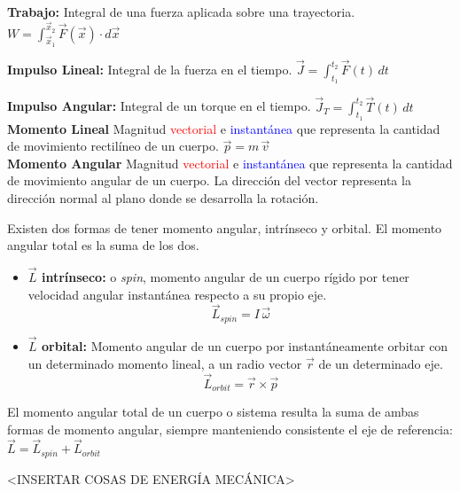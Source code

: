 \documentclass[12pt,a4paper]{article}
\begin{document}
\textbf{Trabajo:} Integral de una fuerza aplicada sobre una trayectoria. $\displaystyle W=\int_{\vec{x}_1}^{\vec{x}_2}\vec{F}(\vec{x})\cdot d\vec{x}$

\textbf{Impulso Lineal:} Integral de la fuerza en el tiempo. $\displaystyle \vec{J}=\int_{t_1}^{t_2}\vec{F}(t)\, dt$

\textbf{Impulso Angular:} Integral de un torque en el tiempo. $\displaystyle  \vec{J}_T=\int_{t_1}^{t_2}\vec{T}(t)\, dt$ \\

\textbf{Momento Lineal} Magnitud \textcolor{red}{vectorial} e \textcolor{blue}{instantánea} que representa la cantidad de movimiento rectilíneo de un cuerpo. $\displaystyle \vec{p}=m \, \vec{v}$ \\

\textbf{Momento Angular} Magnitud \textcolor{red}{vectorial} e \textcolor{blue}{instantánea} que representa la cantidad de movimiento angular de un cuerpo. La dirección del vector representa la dirección normal al plano donde se desarrolla la rotación.

Existen dos formas de tener momento angular, intrínseco y orbital. El momento angular total es la suma de los dos.

\begin{itemize}
	\item \textbf{$\vec{L}$ intrínseco:} o \textit{spin}, momento angular de un cuerpo rígido por tener velocidad angular instantánea respecto a su propio eje. $$\vec{L}_{spin} = I \, \vec{\omega}$$
	

	\item \textbf{$\vec{L}$ orbital:} Momento angular de un cuerpo por instantáneamente orbitar con un determinado momento lineal, a un radio vector $\vec{r}$ de un determinado eje. $$\vec{L}_{orbit} = \vec{r} \times \vec{p}$$
\end{itemize}

El momento angular total de un cuerpo o sistema resulta la suma de ambas formas de momento angular, siempre manteniendo consistente el eje de referencia: $\displaystyle \vec{L}=\vec{L}_{spin}+\vec{L}_{orbit}$


<INSERTAR COSAS DE ENERGÍA MECÁNICA>
\end{document}
